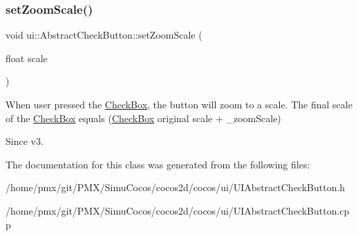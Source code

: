 \subsubsection{\texorpdfstring{set\+Zoom\+Scale()}{setZoomScale()}\hspace{0.1cm}{\footnotesize\ttfamily [2/2]}}
{\footnotesize\ttfamily void ui\+::\+Abstract\+Check\+Button\+::set\+Zoom\+Scale (\begin{DoxyParamCaption}\item[{float}]{scale }\end{DoxyParamCaption})}

When user pressed the \hyperlink{classui_1_1CheckBox}{Check\+Box}, the button will zoom to a scale. The final scale of the \hyperlink{classui_1_1CheckBox}{Check\+Box} equals (\hyperlink{classui_1_1CheckBox}{Check\+Box} original scale + \+\_\+zoom\+Scale) \begin{DoxySince}{Since}
v3. 
\end{DoxySince}


The documentation for this class was generated from the following files\+:\begin{DoxyCompactItemize}
\item 
/home/pmx/git/\+P\+M\+X/\+Simu\+Cocos/cocos2d/cocos/ui/U\+I\+Abstract\+Check\+Button.\+h\item 
/home/pmx/git/\+P\+M\+X/\+Simu\+Cocos/cocos2d/cocos/ui/U\+I\+Abstract\+Check\+Button.\+cpp\end{DoxyCompactItemize}
